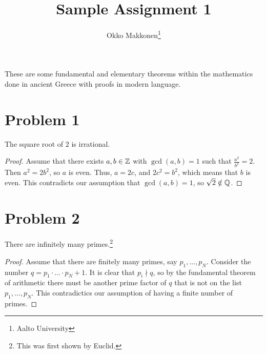 \documentclass{myassignment}
\title{Sample Assignment 1}
\author{Okko Makkonen\thanks{Aalto University}}
\begin{document}
\maketitle

These are some fundamental and elementary theorems within the mathematics done in ancient Greece with proofs in modern language.
    
\section{Problem 1}

\begin{claim}
The square root of $2$ is irrational.
\end{claim}

\begin{proof}
Assume that there exists $a, b \in \mathbb{Z}$ with $\gcd(a, b) = 1$ such that $\frac{a^2}{b^2} = 2$. Then $a^2 = 2b^2$, so $a$ is even. Thus, $a = 2c$, and $2c^2 = b^2$, which means that $b$ is even. This contradicts our assumption that $\gcd(a, b) = 1$, so $\sqrt{2} \notin \mathbb{Q}$.
\end{proof}

\section{Problem 2}

\begin{claim}
There are infinitely many primes.\footnote{This was first shown by Euclid.}
\end{claim}

\begin{proof}
Assume that there are finitely many primes, say $p_1, \dots, p_N$. Consider the number $q = p_1 \cdot \ldots \cdot p_N + 1$. It is clear that $p_i \nmid q$, so by the fundamental theorem of arithmetic there must be another prime factor of $q$ that is not on the list $p_1, \dots, p_N$. This contradictics our assumption of having a finite number of primes.
\end{proof}
\end{document}
